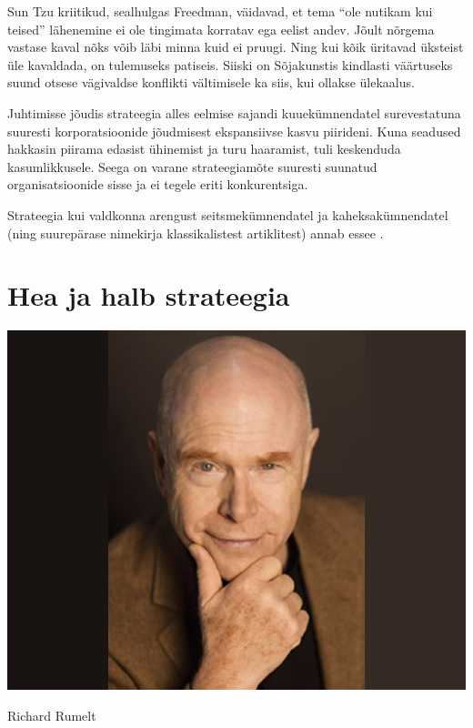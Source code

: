 \documentclass{tufte-book}
\begin{document}
Sun Tzu kriitikud, sealhulgas Freedman, väidavad, et tema \enquote{ole nutikam kui teised} lähenemine ei ole tingimata korratav ega eelist andev. Jõult nõrgema vastase kaval nõks võib läbi minna kuid ei pruugi. Ning kui kõik üritavad üksteist üle kavaldada, on tulemuseks patiseis. Siiski on Sõjakunstis kindlasti väärtuseks suund otsese vägivaldse konflikti vältimisele ka siis, kui ollakse ülekaalus.

Juhtimisse jõudis strateegia alles eelmise sajandi kuuekümnendatel surevestatuna suuresti korporatsioonide jõudmisest ekspansiivse kasvu piirideni. Kuna seadused hakkasin piirama edasist ühinemist ja turu haaramist, tuli keskenduda kasumlikkusele. Seega on varane strateegiamõte suuresti suunatud organisatsioonide sisse ja ei tegele eriti konkurentsiga. 

Strateegia kui valdkonna arengust seitsmekümnendatel ja kaheksakümnendatel (ning suurepärase nimekirja klassikalistest artiklitest) annab \citeauthor{rumelt1991strategic} essee\cite{rumelt1991strategic} .

\section{Hea ja halb strateegia}
\label{sec:strategy:goodbad}

\begin{marginfigure}
	\begin{center}
		\includegraphics[trim={5cm 0 5cm 0},clip,width=.7\linewidth]{richard_rumelt.jpg}
		\caption{Richard Rumelt}
		\label{fig:rumelt}
	\end{center}
\end{marginfigure}
\end{document}
